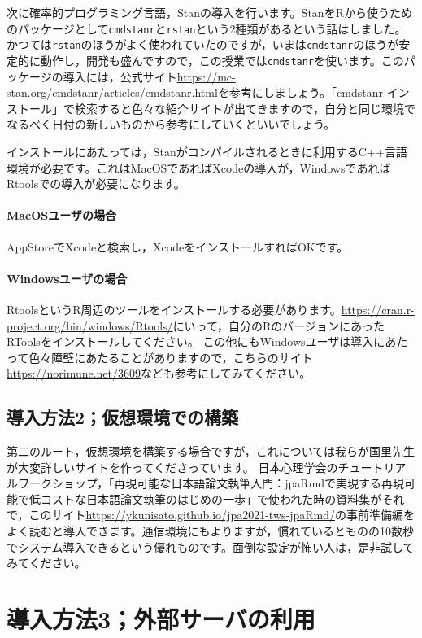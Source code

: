 \documentclass{ltjsbook}
\begin{document}
次に確率的プログラミング言語，Stanの導入を行います。StanをRから使うためのパッケージとして\texttt{cmdstanr}と\texttt{rstan}という2種類があるという話はしました。かつては\texttt{rstan}のほうがよく使われていたのですが，いまは\texttt{cmdstanr}のほうが安定的に動作し，開発も盛んですので，この授業では\texttt{cmdstanr}を使います。このパッケージの導入には，公式サイト\url{https://mc-stan.org/cmdstanr/articles/cmdstanr.html}を参考にしましょう。「cmdstanr インストール」で検索すると色々な紹介サイトが出てきますので，自分と同じ環境でなるべく日付の新しいものから参考にしていくといいでしょう。

インストールにあたっては，Stanがコンパイルされるときに利用するC++言語環境が必要です。これはMacOSであればXcodeの導入が，WindowsであればRtoolsでの導入が必要になります。
\paragraph*{MacOSユーザの場合}AppStoreでXcodeと検索し，XcodeをインストールすればOKです。

\paragraph*{Windowsユーザの場合}RtoolsというR周辺のツールをインストールする必要があります。\url{https://cran.r-project.org/bin/windows/Rtools/}にいって，自分のRのバージョンにあったRToolsをインストールしてください。
この他にもWindowsユーザは導入にあたって色々障壁にあたることがありますので，こちらのサイト\url{https://norimune.net/3609}なども参考にしてみてください。

\subsection{導入方法2；仮想環境での構築}

第二のルート，仮想環境を構築する場合ですが，これについては我らが国里先生が大変詳しいサイトを作ってくださっています。
日本心理学会のチュートリアルワークショップ，「再現可能な日本語論文執筆入門：jpaRmdで実現する再現可能で低コストな日本語論文執筆のはじめの一歩」で使われた時の資料集がそれで，このサイト\url{https://ykunisato.github.io/jpa2021-tws-jpaRmd/}の事前準備編をよく読むと導入できます。通信環境にもよりますが，慣れているとものの10数秒でシステム導入できるという優れものです。面倒な設定が怖い人は，是非試してみてください。


\section{導入方法3；外部サーバの利用}
\end{document}
